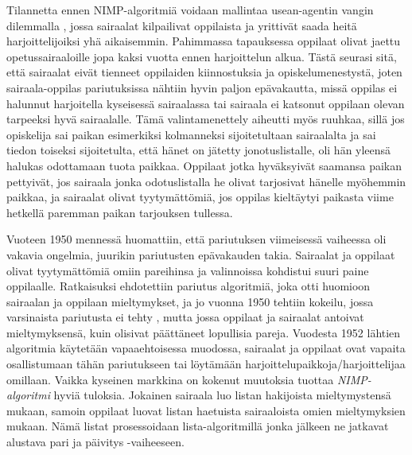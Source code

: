 \documentclass[finnish]{tktltiki2}
\theoremstyle{definition}
\theoremstyle{remark}
\begin{document}
Tilannetta ennen NIMP-algoritmiä voidaan mallintaa usean-agentin vangin dilemmalla \cite{roth84}, jossa sairaalat kilpailivat oppilaista ja yrittivät saada heitä harjoittelijoiksi yhä aikaisemmin. Pahimmassa tapauksessa oppilaat olivat jaettu opetussairaaloille jopa kaksi vuotta ennen harjoittelun alkua. Tästä seurasi sitä, että sairaalat eivät tienneet oppilaiden kiinnostuksia ja opiskelumenestystä, joten sairaala-oppilas pariutuksissa nähtiin hyvin paljon epävakautta, missä oppilas ei halunnut harjoitella kyseisessä sairaalassa tai sairaala ei katsonut oppilaan olevan tarpeeksi hyvä sairaalalle. Tämä valintamenettely aiheutti myös ruuhkaa, sillä jos opiskelija sai paikan esimerkiksi kolmanneksi sijoitetultaan sairaalalta ja sai tiedon toiseksi sijoitetulta, että hänet on jätetty jonotuslistalle, oli hän yleensä halukas odottamaan tuota paikkaa. Oppilaat jotka hyväksyivät saamansa paikan pettyivät, jos sairaala jonka odotuslistalla he olivat tarjosivat hänelle myöhemmin paikkaa, ja sairaalat olivat tyytymättömiä, jos oppilas kieltäytyi paikasta viime hetkellä paremman paikan tarjouksen tullessa.

Vuoteen 1950 mennessä huomattiin, että pariutuksen viimeisessä vaiheessa oli vakavia ongelmia, juurikin pariutusten epävakauden takia. Sairaalat ja oppilaat olivat tyytymättömiä omiin pareihinsa ja valinnoissa kohdistui suuri paine oppilaalle. Ratkaisuksi ehdotettiin pariutus algoritmiä, joka otti huomioon sairaalan ja oppilaan mieltymykset, ja jo vuonna 1950 tehtiin kokeilu, jossa varsinaista pariutusta ei tehty \cite{roth84}, mutta jossa oppilaat ja sairaalat antoivat mieltymyksensä, kuin olisivat päättäneet lopullisia pareja. Vuodesta 1952 lähtien algoritmia käytetään vapaaehtoisessa muodossa, sairaalat ja oppilaat ovat vapaita osallistumaan tähän pariutukseen tai löytämään harjoittelupaikkoja/harjoittelijaa omillaan. Vaikka kyseinen markkina on kokenut muutoksia tuottaa \emph{NIMP-algoritmi} hyviä tuloksia.
Jokainen sairaala luo listan hakijoista mieltymystensä mukaan, samoin oppilaat luovat listan haetuista sairaaloista omien mieltymyksien mukaan. Nämä listat prosessoidaan lista-algoritmillä jonka jälkeen ne jatkavat alustava pari ja päivitys -vaiheeseen.
\end{document}
